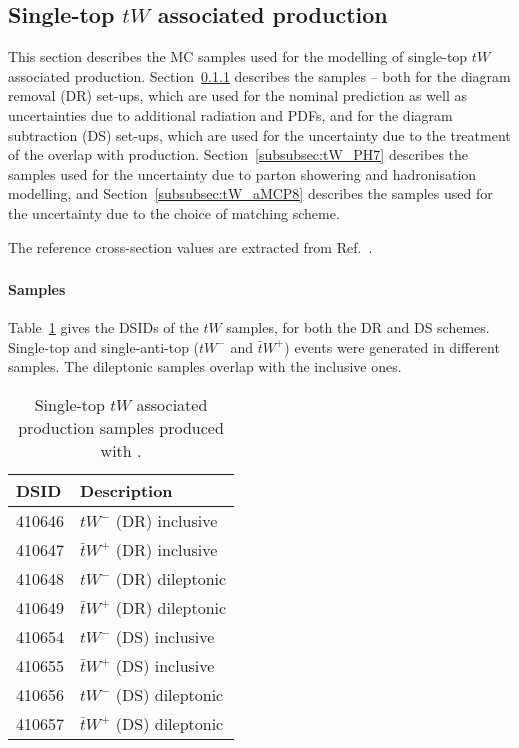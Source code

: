 \subsection{Single-top \texorpdfstring{$tW$}{tW} associated production}
\label{subsec:tW}

This section describes the MC samples used for the modelling of single-top $tW$ associated production.
Section~\ref{subsubsec:tW_PP8} describes the \POWPY[8] samples -- both for the diagram removal (DR) set-ups,
which are used for the nominal prediction as well as uncertainties due to additional radiation and PDFs,  
and for the diagram subtraction (DS) set-ups, which are used for the uncertainty due to the treatment 
of the overlap with \ttbar production. 
Section~\ref{subsubsec:tW_PH7} describes the \POWHER[7] samples used for the uncertainty 
due to parton showering and hadronisation modelling, and Section~\ref{subsubsec:tW_aMCP8} describes the 
\MGNLOPY[8] samples used for the uncertainty due to the choice of matching scheme.

The reference cross-section values are extracted from Ref.~\cite{LHCTopWGsgtopXsec}.

\subsubsection[Powheg+Pythia8]{\POWPY[8]}
\label{subsubsec:tW_PP8}

\paragraph{Samples}

Table~\ref{tab:tW_PP8} gives the DSIDs of the $tW$ \POWPY[8] samples, for both the DR and DS schemes.
Single-top and single-anti-top ($tW^-$ and $\bar{t}W^+$) events were generated in different samples.
The dileptonic samples overlap with the inclusive ones.
\begin{table}[htbp]
\begin{center}
\caption{Single-top $tW$ associated production samples produced with \POWPY[8].} 
\label{tab:tW_PP8}
\begin{tabular}{ l | l }
\hline
DSID & Description \\
\hline
410646 & $tW^-$ (DR) inclusive \\
410647 & $\bar{t}W^+$ (DR) inclusive \\
410648 & $tW^-$ (DR) dileptonic \\
410649 & $\bar{t}W^+$ (DR) dileptonic \\
\hline
410654 & $tW^-$ (DS) inclusive \\
410655 & $\bar{t}W^+$ (DS) inclusive \\
410656 & $tW^-$ (DS) dileptonic \\
410657 & $\bar{t}W^+$ (DS) dileptonic \\
\hline
\end{tabular}
\end{center}
\end{table}

